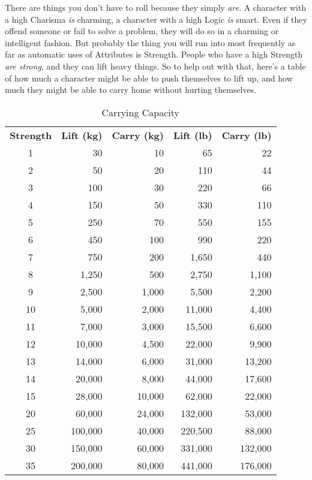 There are things you don't have to roll because they simply \textit{are}. A character with a high Charisma \textit{is} charming, a character with a high Logic \textit{is} smart. Even if they offend someone or fail to solve a problem, they will do so in a charming or intelligent fashion. But probably the thing you will run into most frequently as far as automatic uses of Attributes is Strength. People who have a high Strength \textit{are strong}, and they can lift heavy things. So to help out with that, here's a table of how much a character might be able to push themselves to lift up, and how much they might be able to carry home without hurting themselves.

\begin{table}[htb]  \center
\caption{Carrying Capacity}
\begin{tabular}{c | r r | r r}
\textbf{Strength} & \textbf{Lift (kg)} & \textbf{Carry (kg)} & \textbf{Lift (lb)} & \textbf{Carry (lb)}\\
1 & 30 & 10 & 65 & 22 \\
2 & 50 & 20 & 110 & 44 \\
3 & 100 & 30 & 220 & 66 \\
4 & 150 & 50 & 330 & 110 \\
5 & 250 & 70 & 550 & 155 \\
6 & 450 & 100 & 990 & 220 \\
7 & 750 & 200 & 1,650 & 440 \\
8 & 1,250 & 500 & 2,750 & 1,100 \\
9 & 2,500 & 1,000 & 5,500 & 2,200 \\
10 & 5,000 & 2,000 & 11,000 & 4,400 \\
11 & 7,000 & 3,000 & 15,500 & 6,600 \\
12 & 10,000 & 4,500 & 22,000 & 9,900 \\
13 & 14,000 & 6,000 & 31,000 & 13,200 \\
14 & 20,000 & 8,000 & 44,000 & 17,600 \\
15 & 28,000 & 10,000 & 62,000 & 22,000 \\
20 & 60,000 & 24,000 & 132,000 & 53,000 \\
25 & 100,000 & 40,000 & 220,500 & 88,000 \\
30 & 150,000 & 60,000 & 331,000 & 132,000 \\
35 & 200,000 & 80,000 & 441,000 & 176,000 \\
\end{tabular}
\end{table}

